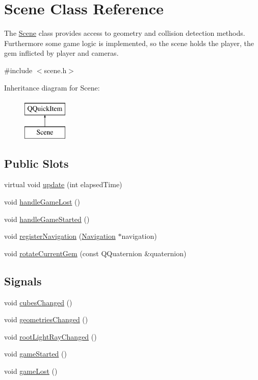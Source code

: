 \hypertarget{class_scene}{}\section{Scene Class Reference}
\label{class_scene}


The \hyperlink{class_scene}{Scene} class provides access to geometry and collision detection methods. Furthermore some game logic is implemented, so the scene holds the player, the gem inflicted by player and cameras.  




{\ttfamily \#include $<$scene.\+h$>$}

Inheritance diagram for Scene\+:\begin{figure}[H]
\begin{center}
\leavevmode
\includegraphics[height=2.000000cm]{class_scene}
\end{center}
\end{figure}
\subsection*{Public Slots}
\begin{DoxyCompactItemize}
\item 
virtual void \hyperlink{class_scene_a0c9213091fb06643b95801d2b406878f}{update} (int elapsed\+Time)
\item 
void \hyperlink{class_scene_a3f593e4e80703153633a76cc628ab539}{handle\+Game\+Lost} ()
\item 
void \hyperlink{class_scene_aceda1edb06b179bd439539965998f7da}{handle\+Game\+Started} ()
\item 
void \hyperlink{class_scene_ace3407a4d148d317a20b1bf205554bc5}{register\+Navigation} (\hyperlink{class_navigation}{Navigation} $\ast$navigation)
\item 
void \hyperlink{class_scene_ade6d7968a2bad7c1dfbae98045a8aa7d}{rotate\+Current\+Gem} (const Q\+Quaternion \&quaternion)
\end{DoxyCompactItemize}
\subsection*{Signals}
\begin{DoxyCompactItemize}
\item 
void \hyperlink{class_scene_a9c23e7cda34a3089165ce18c2ec89c15}{cubes\+Changed} ()
\item 
void \hyperlink{class_scene_a8df7e2ef0bf2910fa03df1c16b255551}{geometries\+Changed} ()
\item 
void \hyperlink{class_scene_a4eed91c96f13a7646830737b820755c4}{root\+Light\+Ray\+Changed} ()
\item 
void \hyperlink{class_scene_a700dd8faf803b34d7b374c5aded06d45}{game\+Started} ()
\item 
void \hyperlink{class_scene_aa73ff5f1f6c873357149afe83c749d09}{game\+Lost} ()
\end{DoxyCompactItemize}
